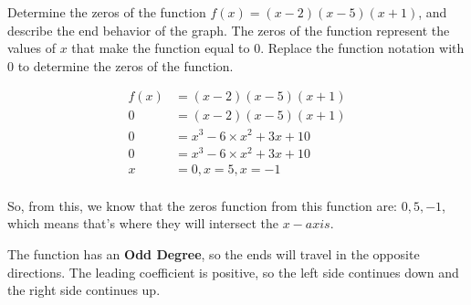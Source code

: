 \begin{example}[Example 1]
    Determine the zeros of the function $f(x) = (x - 2)(x - 5)(x + 1)$, and describe the end behavior of the graph.
    The zeros of the function represent the values of $x$ that make the function equal to $0$. Replace the function notation with $0$ to determine the zeros of the function.
    
    \begin{align}
        f(x) &= (x - 2)(x - 5)(x + 1) \\
        0 &= (x - 2)(x - 5)(x + 1) \\
        0 &= x^3 - 6 \times x^2 + 3x + 10 \\
        0 &= x^3 - 6 \times x^2 + 3x + 10 \\
        x &= 0, x = 5, x = -1 \\
    \end{align}
    
    So, from this, we know that the zeros function from this function are: $0, 5, -1$, which means that's where they will intersect the $x-axis$.
    
    The function has an \textbf{Odd Degree}, so the ends will travel in the opposite directions. The leading coefficient is positive, so the left side continues down and the right side continues up.
\end{example}

\newpage
